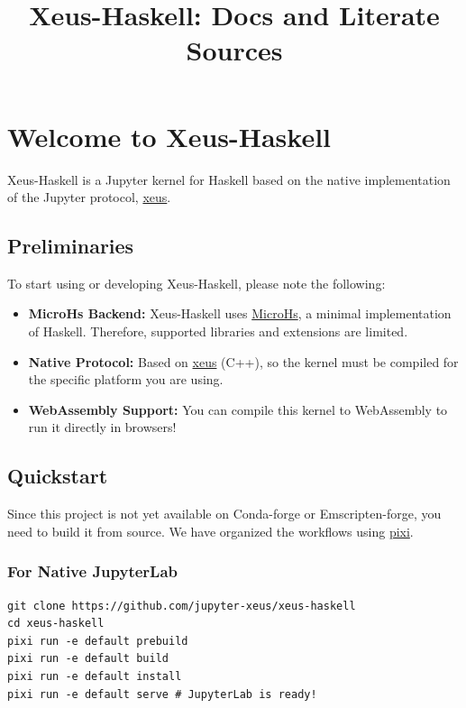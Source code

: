 \documentclass[11pt]{article}
\title{Xeus-Haskell: Docs and Literate Sources}
\author{}
\date{}
\begin{document}
\maketitle
\tableofcontents
\newpage

\section{Welcome to Xeus-Haskell}


Xeus-Haskell is a Jupyter kernel for Haskell based on the native implementation of the Jupyter protocol, \href{https://github.com/jupyter-xeus/xeus}{xeus}.
\subsection{Preliminaries}


To start using or developing Xeus-Haskell, please note the following:
\begin{itemize}
\item \textbf{MicroHs Backend:} Xeus-Haskell uses \href{https://github.com/augustss/MicroHs}{MicroHs}, a minimal implementation of Haskell. Therefore, supported libraries and extensions are limited.
\item \textbf{Native Protocol:} Based on \href{https://github.com/jupyter-xeus/xeus}{xeus} (C++), so the kernel must be compiled for the specific platform you are using.
\item \textbf{WebAssembly Support:} You can compile this kernel to WebAssembly to run it directly in browsers!
\end{itemize}


\subsection{Quickstart}


Since this project is not yet available on Conda-forge or Emscripten-forge, you need to build it from source. We have organized the workflows using \href{https://pixi.sh}{pixi}.
\subsubsection{For Native JupyterLab}


\begin{verbatim}
git clone https://github.com/jupyter-xeus/xeus-haskell
cd xeus-haskell
pixi run -e default prebuild
pixi run -e default build
pixi run -e default install
pixi run -e default serve # JupyterLab is ready!
\end{verbatim}
\end{document}
